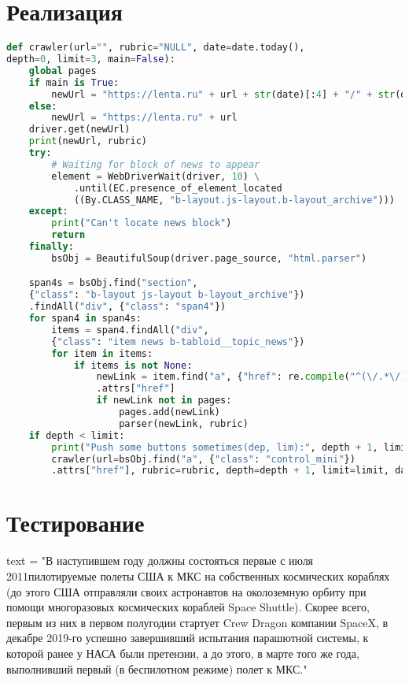 \section*{Реализация}

\begin{lstlisting}[language=Python]
def crawler(url="", rubric="NULL", date=date.today(),
depth=0, limit=3, main=False):
    global pages
    if main is True:
        newUrl = "https://lenta.ru" + url + str(date)[:4] + "/" + str(date)[5:7] + "/" + str(date)[8:] + "/"
    else:
        newUrl = "https://lenta.ru" + url
    driver.get(newUrl)
    print(newUrl, rubric)
    try:
        # Waiting for block of news to appear
        element = WebDriverWait(driver, 10) \
            .until(EC.presence_of_element_located
            ((By.CLASS_NAME, "b-layout.js-layout.b-layout_archive")))
    except:
        print("Can't locate news block")
        return
    finally:
        bsObj = BeautifulSoup(driver.page_source, "html.parser")

    span4s = bsObj.find("section",
    {"class": "b-layout js-layout b-layout_archive"})
    .findAll("div", {"class": "span4"})
    for span4 in span4s:
        items = span4.findAll("div", 
        {"class": "item news b-tabloid__topic_news"})
        for item in items:
            if items is not None:
                newLink = item.find("a", {"href": re.compile("^(\/.*\/).*")})
                .attrs["href"]
                if newLink not in pages:
                    pages.add(newLink)
                    parser(newLink, rubric)
    if depth < limit:
        print("Push some buttons sometimes(dep, lim):", depth + 1, limit)
        crawler(url=bsObj.find("a", {"class": "control_mini"})
        .attrs["href"], rubric=rubric, depth=depth + 1, limit=limit, date=date)

\end{lstlisting}

\section*{Тестирование}

text = "В наступившем году должны состояться первые с июля 2011 пилотируемые полеты США к МКС на собственных космических кораблях (до этого США отправляли своих астронавтов на околоземную орбиту при помощи многоразовых космических кораблей Space Shuttle). Скорее всего, первым из них в первом полугодии стартует Crew Dragon компании SpaceX, в декабре 2019-го успешно завершивший испытания парашютной системы, к которой ранее у НАСА были претензии, а до этого, в марте того же года, выполнивший первый (в беспилотном режиме) полет к МКС."

